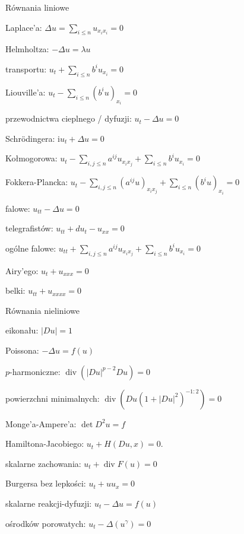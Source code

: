 \begin{multicols*}{2}
\raggedright

\begin{enumx}
\item Równania liniowe
	\begin{enumx}
	\item Laplace'a: $\Delta u = \sum_{i \le n} u_{x_ix_i} = 0$
	\item Helmholtza: $-\Delta u = \lambda u$
	\item transportu: $u_t + \sum_{i \le n} b^i u_{x_i} = 0$
	\item Liouville'a: $u_t - \sum_{i \le n} (b^i u)_{x_i} = 0$
	\item przewodnictwa cieplnego / dyfuzji: $u_t - \Delta u = 0$
	\item Schrödingera: $\textrm{i} u_t + \Delta u = 0$
	\item Kołmogorowa: $u_t - \sum_{i, j \le n} a^{ij} u_{x_ix_j} + \sum_{i \le n} b^i u_{x_i} = 0$
	\item Fokkera-Plancka: $u_t - \sum_{i, j \le n} (a^{ij} u)_{x_ix_j} + \sum_{i \le n} (b^i u)_{x_i} = 0$
	\item falowe: $u_{tt} - \Delta u = 0$
	\item telegrafistów: $u_{tt} + du_t - u_{xx} = 0$
	\item ogólne falowe: $u_{tt} + \sum_{i, j \le n} a^{ij} u_{x_ix_j} + \sum_{i \le n} b^i u_{x_i} = 0$
	\item Airy'ego: $u_t + u_{xxx} = 0$
	\item belki: $u_{tt} + u_{xxxx} = 0$
	\end{enumx}
\item Równania nieliniowe
	\begin{enumx}
	\item eikonału: $|Du| = 1$
	\item Poissona: $- \Delta u = f(u)$
	\item $p$-harmoniczne: $\operatorname{div} (|Du|^{p-2} Du) = 0$
	\item powierzchni minimalnych: $\operatorname{div} (Du (1+|Du|^2)^{-1:2})=0$
	\item Monge'a-Ampere'a: $\det D^2 u = f$
	\item Hamiltona-Jacobiego: $u_t + H(Du, x) = 0$.
	\item skalarne zachowania: $u_t + \operatorname{div} F(u)=0$
	\item Burgersa bez lepkości: $u_t + uu_x = 0$
	\item skalarne reakcji-dyfuzji: $u_t - \Delta u = f(u)$
	\item ośrodków porowatych: $u_t - \Delta (u^\gamma) = 0$

\end{enumx}
\end{enumx}
\end{multicols*}
